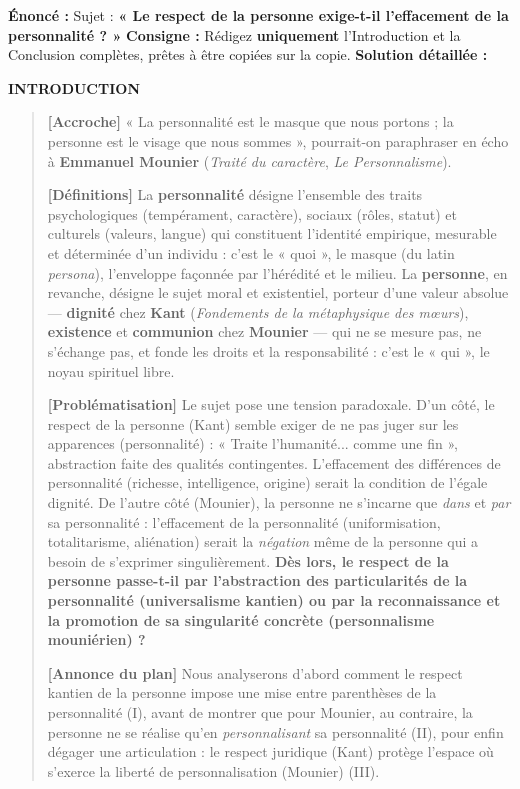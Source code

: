 \documentclass[11pt]{article}
\begin{document}
\begin{exoresolu}
\textbf{Énoncé :} Sujet : \textbf{« Le respect de la personne exige-t-il l'effacement de la personnalité ? »}
\textbf{Consigne :} Rédigez \textbf{uniquement} l'Introduction et la Conclusion complètes, prêtes à être copiées sur la copie.
\tcblower
\textbf{Solution détaillée :}

\textbf{INTRODUCTION}
\begin{quote}
\textbf{[Accroche]} « La personnalité est le masque que nous portons ; la personne est le visage que nous sommes », pourrait-on paraphraser en écho à \textbf{Emmanuel Mounier} (\textit{Traité du caractère}, \textit{Le Personnalisme}). 

\textbf{[Définitions]} La \textbf{personnalité} désigne l'ensemble des traits psychologiques (tempérament, caractère), sociaux (rôles, statut) et culturels (valeurs, langue) qui constituent l'identité empirique, mesurable et déterminée d'un individu : c'est le « quoi », le masque (du latin \emph{persona}), l'enveloppe façonnée par l'hérédité et le milieu. La \textbf{personne}, en revanche, désigne le sujet moral et existentiel, porteur d'une valeur absolue — \textbf{dignité} chez \textbf{Kant} (\textit{Fondements de la métaphysique des mœurs}), \textbf{existence} et \textbf{communion} chez \textbf{Mounier} — qui ne se mesure pas, ne s'échange pas, et fonde les droits et la responsabilité : c'est le « qui », le noyau spirituel libre.

\textbf{[Problématisation]} Le sujet pose une tension paradoxale. D'un côté, le respect de la personne (Kant) semble exiger de ne pas juger sur les apparences (personnalité) : « Traite l'humanité... comme une fin », abstraction faite des qualités contingentes. L'effacement des différences de personnalité (richesse, intelligence, origine) serait la condition de l'égale dignité. De l'autre côté (Mounier), la personne ne s'incarne que \emph{dans} et \emph{par} sa personnalité : l'effacement de la personnalité (uniformisation, totalitarisme, aliénation) serait la \emph{négation} même de la personne qui a besoin de s'exprimer singulièrement. \textbf{Dès lors, le respect de la personne passe-t-il par l'abstraction des particularités de la personnalité (universalisme kantien) ou par la reconnaissance et la promotion de sa singularité concrète (personnalisme mouniérien) ?}

\textbf{[Annonce du plan]} Nous analyserons d'abord comment le respect kantien de la personne impose une mise entre parenthèses de la personnalité (I), avant de montrer que pour Mounier, au contraire, la personne ne se réalise qu'en \emph{personnalisant} sa personnalité (II), pour enfin dégager une articulation : le respect juridique (Kant) protège l'espace où s'exerce la liberté de personnalisation (Mounier) (III).
\end{quote}


\end{exoresolu}
\end{document}
